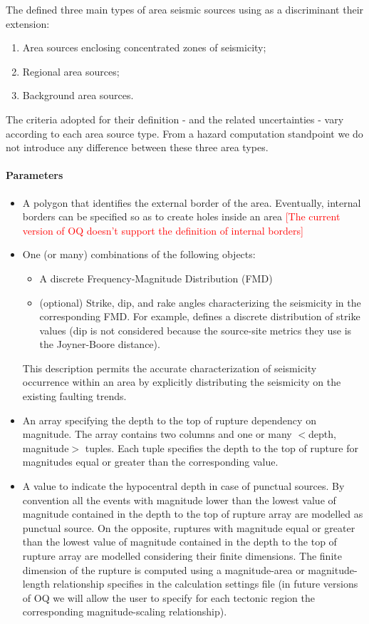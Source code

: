 The \citet{sshac1997} defined three main types of area seismic sources using as 
a discriminant their extension:
\begin{enumerate}
\item Area sources enclosing concentrated zones of seismicity;
\item Regional area sources;
\item Background area sources.
\end{enumerate}
The criteria adopted for their definition - and the related uncertainties - vary 
according to each area source type. From a hazard computation standpoint we do 
not introduce any difference between these three area types.
%
\paragraph{Parameters}
\begin{itemize}
\item A polygon that identifies the external border of the area. Eventually, 
internal borders can be specified so as to create holes inside an area
	\textcolor{red}{[The current version of OQ doesn't support the definition 
	of internal borders]}
\item One (or many) combinations of the following objects:
\begin{itemize}
	\item A discrete Frequency-Magnitude Distribution (FMD)
	\item (optional) Strike, dip, and rake angles characterizing the seismicity 
	in the corresponding FMD.
	For example, \cite{coppersmith2009} defines a discrete distribution of 
	strike values (dip is not considered because the source-site metrics they 
	use is the Joyner-Boore distance). 
\end{itemize}
This description permits the accurate characterization of seismicity occurrence 
within an area by explicitly distributing the seismicity on the existing 
faulting trends. 
\item An array specifying the depth to the top of rupture dependency on 
magnitude. The array contains two columns and one or many $<$depth, 
magnitude$>$ tuples. Each tuple specifies the depth to the top of rupture 
for magnitudes equal or greater than the corresponding value. 
\item A value to indicate the hypocentral depth in case of punctual sources. 
By convention all the events with magnitude lower than the lowest value of 
magnitude contained in the depth to the top of rupture array are modelled 
as punctual source. On the opposite, ruptures with magnitude equal or 
greater than the lowest value of magnitude contained in the depth to the 
top of rupture array are modelled considering their finite dimensions. 
The finite dimension of the rupture is computed using a magnitude-area or 
magnitude-length relationship specifies in the calculation settings file 
(in future versions of OQ we will allow the user to specify for each 
tectonic region the corresponding magnitude-scaling relationship).
\end{itemize}

